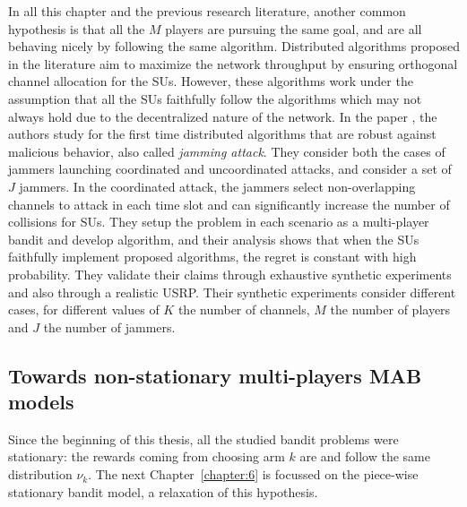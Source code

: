 In all this chapter and the previous research literature, another common hypothesis is that all the $M$ players are pursuing the same goal, and are all behaving nicely by following the same algorithm.
Distributed algorithms proposed in the literature aim to maximize the network throughput by ensuring orthogonal channel allocation for the SUs.
However, these algorithms work under the assumption that all the SUs faithfully follow the algorithms which may not always hold due to the decentralized nature of the network.
In the paper \cite{SawantKumar2018}, the authors study for the first time distributed algorithms that are robust against malicious behavior, also called \emph{jamming attack}.
They consider both the cases of jammers launching coordinated and uncoordinated attacks, and consider a set of $J$ jammers.
In the coordinated attack, the jammers select non-overlapping channels to attack in each time slot and can significantly increase the number of collisions for SUs.
They setup the problem in each scenario as a multi-player bandit and develop algorithm,
and their analysis shows that when the SUs faithfully implement proposed algorithms, the regret is constant with high probability.
They validate their claims through exhaustive synthetic experiments and also through a realistic USRP.
Their synthetic experiments consider different cases, for different values of $K$ the number of channels, $M$ the number of players and $J$ the number of jammers.



\subsection{Towards non-stationary multi-players MAB models}
\label{sub:5:towardsNonStationaryModels}

Since the beginning of this thesis, all the studied bandit problems were stationary: the rewards coming from choosing arm $k$ are \iid{} and follow the same distribution $\nu_k$.
The next Chapter~\ref{chapter:6} is focussed on the piece-wise stationary bandit model, a relaxation of this hypothesis.

